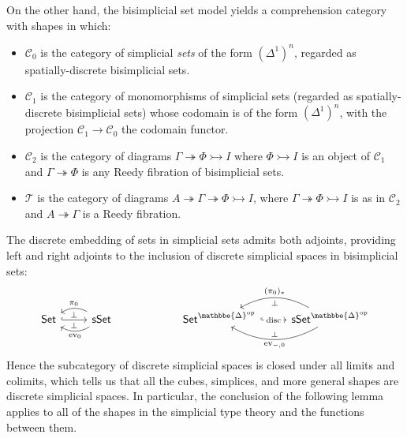 \documentclass[12pt]{amsart}
\theoremstyle{plain}
\theoremstyle{definition}
\theoremstyle{remark}
\numberwithin{equation}{section}
\newcommand{\Set}{\mathsf{Set}}
\newcommand{\sSet}{\mathsf{sSet}}
\newcommand{\DDelta}{\mathbbe{\Delta}}
\newcommand{\op}{\mathrm{op}}
\newcommand{\C}{\mathcal{C}}
\newcommand{\T}{\mathcal{T}}
\begin{document}
On the other hand, the bisimplicial set model yields a comprehension category with shapes in which:
\begin{itemize}
\item $\C_0$ is the category of simplicial \emph{sets} of the form $(\Delta^1)^n$, regarded as spatially-discrete bisimplicial sets.
\item $\C_1$ is the category of monomorphisms of simplicial sets (regarded as spatially-discrete bisimplicial sets) whose codomain is of the form $(\Delta^1)^n$, with the projection $\C_1\to\C_0$ the codomain functor.
\item $\C_2$ is the category of diagrams $\Gamma \twoheadrightarrow \Phi\rightarrowtail I$ where $\Phi\rightarrowtail I$ is an object of $\C_1$ and $\Gamma\twoheadrightarrow \Phi$ is any Reedy fibration of bisimplicial sets.
\item $\T$ is the category of diagrams $A \twoheadrightarrow \Gamma \twoheadrightarrow \Phi\rightarrowtail I$, where $\Gamma \twoheadrightarrow \Phi\rightarrowtail I$ is as in $\C_2$ and $A \twoheadrightarrow \Gamma$ is a Reedy fibration.
\end{itemize}

The discrete embedding of sets in simplicial sets admits both adjoints, providing left and right adjoints to the inclusion of discrete simplicial spaces in bisimplicial sets:
\[
\begin{tikzcd}[row sep=large]
\Set \arrow[r, hook, "\perp", "\perp"'] & \sSet \arrow[l, bend right, "\pi_0"'] \arrow[l, bend left, "\mathrm{ev}_0"] & \rightsquigarrow & \Set^{\DDelta^\op} \arrow[r, hook, "{\mathrm{disc}}" description] & \sSet^{\DDelta^\op} \arrow[l, bend right, "(\pi_0)_*"', "\perp"] \arrow[l, bend left, "\mathrm{ev}_{-,0}", "\perp"'] 
\end{tikzcd}
\]
Hence the subcategory of discrete simplicial spaces is closed under all limits and colimits, which tells us that all the cubes, simplices, and more general shapes are discrete simplicial spaces. In particular, the conclusion of the following lemma applies to all of the shapes in the simplicial type theory and the functions between them.
\end{document}
